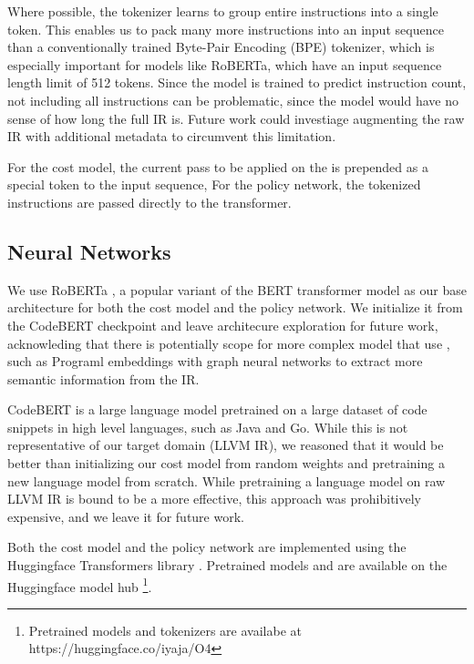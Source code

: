 \documentclass[conference]{IEEEtran}
\begin{document}
Where possible, the tokenizer learns to group entire instructions into a single
token. This enables us to pack many more instructions into an input sequence
than a conventionally trained Byte-Pair Encoding (BPE) tokenizer, which is
especially important for models like RoBERTa, which have an input sequence
length limit of 512 tokens. Since the model is trained to predict instruction
count, not including all instructions can be problematic, since the model would
have no sense of how long the full IR is. Future work could investiage
augmenting the raw IR with additional metadata to circumvent this limitation.

For the cost model, the current pass to be applied on the is prepended as a
special token to the input sequence, For the policy network, the tokenized
instructions are passed directly to the transformer.

\label{sec:neural_network}
\subsection{Neural Networks}

We use RoBERTa \cite{liu2019roberta}, a popular variant of the BERT
\cite{devlin2018bert} transformer model  as our base architecture for both the
cost model and the policy network. We initialize it from the CodeBERT
\cite{feng2020codebert} checkpoint and leave architecure exploration for future
work, acknowleding that there is potentially scope for more complex model that
use , such as Programl embeddings \cite{cummins2020programl} with graph neural
networks to extract more semantic information from the IR.

CodeBERT \cite{feng2020codebert} is a large language model pretrained on a large
dataset of code snippets in high level languages, such as Java and Go. While
this is not representative of our target domain (LLVM IR), we reasoned that it
would be better than initializing our cost model from random weights and
pretraining a new language model from scratch. While pretraining a language
model on raw LLVM IR is bound to be a more effective, this approach was
prohibitively expensive, and we leave it for future work.

Both the cost model and the policy network are implemented using the Huggingface
Transformers library \cite{wolf2019huggingface}. Pretrained models and are
available on the Huggingface model hub \footnote{Pretrained models and
  tokenizers are availabe at https://huggingface.co/iyaja/O4}.
\end{document}
